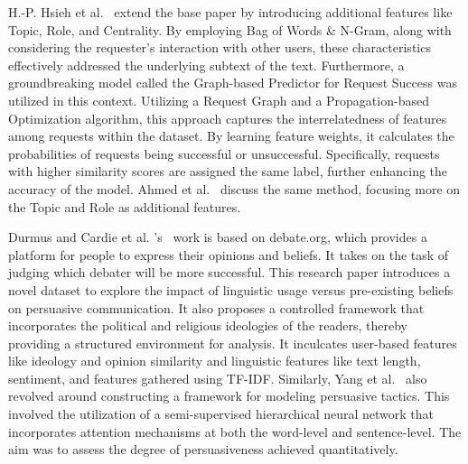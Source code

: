\documentclass[runningheads]{llncs}
\begin{document}
H.-P. Hsieh et al.~\cite{raop_gprs} extend the base paper by introducing additional features like Topic, Role, and Centrality. By employing Bag of Words \& N-Gram, along with considering the requester's interaction with other users, these characteristics effectively addressed the underlying subtext of the text. Furthermore, a groundbreaking model called the Graph-based Predictor for Request Success was utilized in this context. Utilizing a Request Graph and a Propagation-based Optimization algorithm, this approach captures the interrelatedness of features among requests within the dataset. By learning feature weights, it calculates the probabilities of requests being successful or unsuccessful. Specifically, requests with higher similarity scores are assigned the same label, further enhancing the accuracy of the model. Ahmed et al.~\cite{raop_gprs2} discuss the same method, focusing more on the Topic and Role as additional features.

Durmus and Cardie et al. 's~\cite{debate} work is based on debate.org, which provides a platform for people to express their opinions and beliefs. It takes on the task of judging which debater will be more successful. This research paper introduces a novel dataset to explore the impact of linguistic usage versus pre-existing beliefs on persuasive communication. It also proposes a controlled framework that incorporates the political and religious ideologies of the readers, thereby providing a structured environment for analysis. It inculcates user-based features like ideology and opinion similarity and linguistic features like text length, sentiment, and features gathered using TF-IDF. Similarly, Yang et al.~\cite{neural_req1,neural_req2} also revolved around constructing a framework for modeling persuasive tactics. This involved the utilization of a semi-supervised hierarchical neural network that incorporates attention mechanisms at both the word-level and sentence-level. The aim was to assess the degree of persuasiveness achieved quantitatively.
\end{document}
